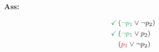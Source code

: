 \begin{minipage}[t]{0.2\textwidth}
  \textbf{Ass:} \underline{}
  \centering{}
  \label{fig1}
\end{minipage}
\begin{minipage}[t]{0.2\textwidth}
$$
\begin{aligned}
\text{\textcolor{Green}{\checkmark}} &\left(\text{\textcolor{Green}{$\neg p_1$}} \vee \neg p_{2}\right) \\
\textcolor{Green}{\checkmark} &\left(\text{\textcolor{Green}{$\neg p_1$}} \vee p_{2}\right) \\
&\left(\text{\textcolor{red}{$p_1$}} \vee \neg p_{2}\right)
\end{aligned}
$$
\end{minipage}

